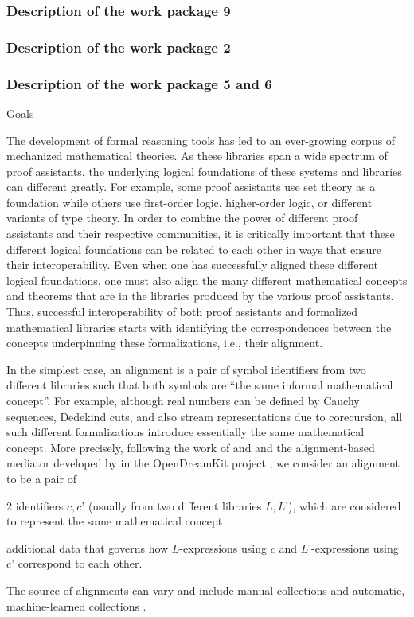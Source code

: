 \subsubsection{Description of the work package 9}

\subsubsection{Description of the work package 2}

\subsubsection{Description of the work package 5 and 6}

{\color{red} Goals}

The development of formal reasoning tools has led to an ever-growing
corpus of mechanized mathematical theories. As these libraries span a
wide spectrum of proof assistants, the underlying logical foundations
of these systems and libraries can different greatly. For example,
some proof assistants use set theory as a foundation while others use
first-order logic, higher-order logic, or different variants of type
theory.  In order to combine the power of different proof assistants
and their respective communities, it is critically important that
these different logical foundations can be related to each other in
ways that ensure their interoperability.  Even when one has
successfully aligned these different logical foundations, one must
also align the many different mathematical concepts and theorems that
are in the libraries produced by the various proof assistants. Thus,
successful interoperability of both proof assistants and formalized
mathematical libraries starts with identifying the correspondences
between the concepts underpinning these formalizations, i.e., their
alignment.

In the simplest case, an alignment is a pair of symbol identifiers
from two different libraries such that both symbols are ``the same
informal mathematical concept''. For example, although real numbers
can be defined by Cauchy sequences, Dedekind cuts, and also stream
representations due to corecursion, all such different formalizations
introduce essentially the same mathematical concept. More precisely,
following the work of  and 
\cite{GKKMR:alignments:17} and the alignment-based mediator developed
by  in the OpenDreamKit project \cite{ODK:mitm:18}, we
consider an alignment to be a pair of
\begin{compactitem}
  \item $2$ identifiers $c,c’$ (usually from two different libraries
    $L,L’$), which are considered to represent the same mathematical
    concept
  \item additional data that governs how $L$-expressions using $c$ and
    $L’$-expressions using $c’$ correspond to each other.
\end{compactitem}
The source of alignments can vary and include manual collections
\cite{MRLR:alignments:17} and automatic, machine-learned collections
\cite{align_kaliszyk}.


